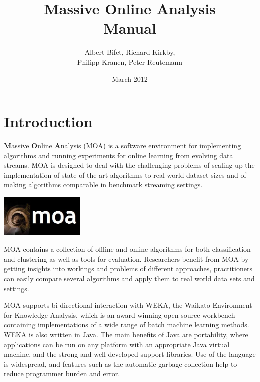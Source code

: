 \documentclass[a4paper,12pt,twoside]{book}
\title{
\textbf{Massive Online Analysis}  \\ 
Manual
}
\author{Albert Bifet, Richard Kirkby, \\Philipp Kranen, Peter Reutemann }
\date{March 2012}
\begin{document}
\lstset{language=Java,basicstyle=\tiny,numbers=left}

\maketitle
{}
\thispagestyle{empty}
\cleardoublepage
\thispagestyle{empty}
\tableofcontents
\cleardoublepage
{}

\chapter{Introduction}

{\bf M}assive {\bf O}nline {\bf A}nalysis (MOA) 
is a software environment for implementing algorithms and running experiments for online learning from evolving data streams. 
MOA is designed to deal with the challenging problems of scaling up the implementation of state of the art algorithms to real 
world dataset sizes and of making algorithms comparable in benchmark streaming settings.

\begin{center}
\includegraphics[height=2cm]{figures/LogoMOA.jpg} \end{center}

MOA contains a collection of offline 
and online algorithms for both classification and clustering as well as tools for evaluation.  
Researchers benefit from MOA by getting insights into workings and problems of different approaches, practitioners can 
easily compare several algorithms and apply them to real world data sets and settings. 

MOA supports bi-directional interaction
 with WEKA, the Waikato Environment for Knowledge Analysis, 
which is an award-winning open-source 
workbench containing implementations of a wide range of batch machine 
learning methods. WEKA is also written in Java. The main benefits
of Java are portability, where applications can be run on any platform with
an appropriate Java virtual machine, and the strong and well-developed support 
libraries. Use of the language is widespread, and features such as the
automatic garbage collection help to reduce programmer burden and error.
\end{document}
